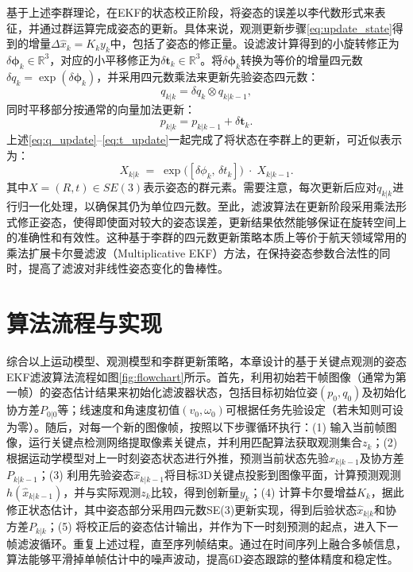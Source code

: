基于上述李群理论，在EKF的状态校正阶段，将姿态的误差以李代数形式来表征，并通过群运算完成姿态的更新。具体来说，观测更新步骤\eqref{eq:update_state}得到的增量$\Delta \hat{x}_k = K_ky_k$中，包括了姿态的修正量。设滤波计算得到的小旋转修正为$\delta \boldsymbol{\phi}_k \in \mathbb{R}^3$，对应的小平移修正为$\delta \mathbf{t}_k \in \mathbb{R}^3$。将$\delta \boldsymbol{\phi}_k$转换为等价的增量四元数$\delta q_k = \exp(\delta \boldsymbol{\phi}_k)$，并采用四元数乘法来更新先验姿态四元数： \begin{equation}
	\label{eq:q_update} q_{k|k} = \delta q_k \otimes q_{k|k-1},
\end{equation} 同时平移部分按通常的向量加法更新： 
\begin{equation}
\label{eq:t_update}
 p_{k|k} = p_{k|k-1} + \delta \mathbf{t}_k. 
 \end{equation} 
 上述\eqref{eq:q_update}--\eqref{eq:t_update}一起完成了将状态在李群上的更新，可近似表示为：
\begin{equation}
	\label{eq:X_update}
	X_{k|k} \;=\; \exp\bigl([\delta \phi_k,\, \delta t_k]\bigr)\;\cdot\;X_{k|k-1}.
\end{equation}
其中$X = (R, t) \in SE(3)$表示姿态的群元素。需要注意，每次更新后应对$q_{k|k}$进行归一化处理，以确保其仍为单位四元数。至此，滤波算法在更新阶段采用乘法形式修正姿态，使得即使面对较大的姿态误差，更新结果依然能够保证在旋转空间上的准确性和有效性。这种基于李群的四元数更新策略本质上等价于航天领域常用的乘法扩展卡尔曼滤波（Multiplicative EKF）方法，在保持姿态参数合法性的同时，提高了滤波对非线性姿态变化的鲁棒性。

\section{算法流程与实现}

综合以上运动模型、观测模型和李群更新策略，本章设计的基于关键点观测的姿态EKF滤波算法流程如图\ref{fig:flowchart}所示。首先，利用初始若干帧图像（通常为第一帧）的姿态估计结果来初始化滤波器状态，包括目标初始位姿$(p_0, q_0)$及初始化协方差$P_{0|0}$等；线速度和角速度初值$(v_0, \omega_0)$可根据任务先验设定（若未知则可设为零）。随后，对每一个新的图像帧，按照以下步骤循环执行：(1) 输入当前帧图像，运行关键点检测网络提取像素关键点，并利用匹配算法获取观测集合$z_k$；(2) 根据运动学模型对上一时刻姿态状态进行外推，预测当前状态先验$\hat{x}_{k|k-1}$及协方差$P_{k|k-1}$；(3) 利用先验姿态$\hat{x}_{k|k-1}$将目标3D关键点投影到图像平面，计算预测观测$h(\hat{x}_{k|k-1})$，并与实际观测$z_k$比较，得到创新量$y_k$；(4) 计算卡尔曼增益$K_k$，据此修正状态估计，其中姿态部分采用四元数SE(3)更新实现，得到后验状态$\hat{x}_{k|k}$和协方差$P_{k|k}$；(5) 将校正后的姿态估计输出，并作为下一时刻预测的起点，进入下一帧滤波循环。重复上述过程，直至序列帧结束。通过在时间序列上融合多帧信息，算法能够平滑掉单帧估计中的噪声波动，提高6D姿态跟踪的整体精度和稳定性。


